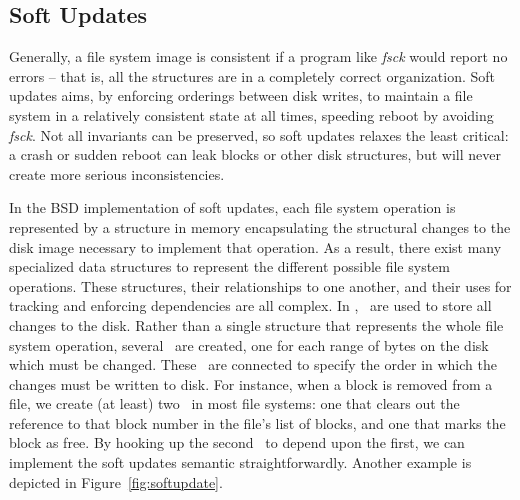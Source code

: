 \subsection {Soft Updates}
\label{sec:using:softupdate}

Generally, a file system image is consistent if a program like \emph{fsck}
would report no errors -- that is, all the structures are in a completely
correct organization.  
%
Soft updates aims, by enforcing orderings between disk writes, to maintain
a file system in a relatively consistent state at all times, speeding reboot
by avoiding \emph{fsck}.
%
Not all invariants can be preserved, so soft updates relaxes the least
critical: a crash or sudden reboot can leak blocks or other disk
structures, but will never create more serious inconsistencies.
%
%

In the BSD implementation of soft updates, each file system operation is
represented by a structure in memory encapsulating the structural changes to the
disk image necessary to implement that operation. As a result, there exist many
specialized data structures to represent the different possible file system
operations. These structures, their relationships to one another, and their uses
for tracking and enforcing dependencies are all complex.
%
In \Kudos, \chdescs\ are used to store all changes to the disk. Rather than a
single structure that represents the whole file system operation, several
\chdescs\ are created, one for each range of bytes on the disk which must be
changed. These \chdescs\ are connected to specify the order in which the changes
must be written to disk. For instance, when a block is removed from a file, we
create (at least) two \chdescs\ in most file systems: one that clears out the
reference to that block number in the file's list of blocks, and one that marks
the block as free. By hooking up the second \chdesc\ to depend upon the first,
we can implement the soft updates semantic straightforwardly. Another example is
depicted in Figure~\ref{fig:softupdate}.

